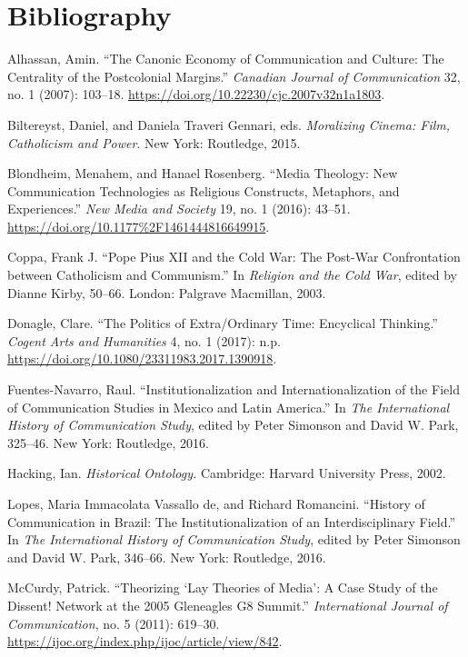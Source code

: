 \documentclass{tufte-handout}
\begin{document}
\section{Bibliography}\label{bibliography}

\begin{hangparas}{.25in}{1} 



Alhassan, Amin. ``The Canonic Economy of Communication and Culture: The
Centrality of the Postcolonial Margins.'' \emph{Canadian Journal of
Communication} 32, no. 1 (2007): 103­--18.
\url{https://doi.org/10.22230/cjc.2007v32n1a1803}.

Biltereyst, Daniel, and Daniela Traveri Gennari, eds. \emph{Moralizing Cinema: Film, Catholicism and Power}. New York: Routledge, 2015.

Blondheim, Menahem, and Hanael Rosenberg. ``Media Theology: New
Communication Technologies as Religious Constructs, Metaphors, and
Experiences.'' \emph{New Media and Society} 19, no. 1 (2016): 43--51.
\url{https://doi.org/10.1177\%2F1461444816649915}.

Coppa, Frank J. ``Pope Pius XII and the Cold War: The Post-War
Confrontation between Catholicism and Communism.'' In \emph{Religion and
the Cold War}, edited by Dianne Kirby, 50--66. London: Palgrave
Macmillan, 2003.

Donagle, Clare. ``The Politics of Extra/Ordinary Time: Encyclical
Thinking.'' \emph{Cogent Arts and Humanities} 4, no. 1 (2017): n.p.
\url{https://doi.org/10.1080/23311983.2017.1390918}.

Fuentes-Navarro, Raul. ``Institutionalization and Internationalization
of the Field of Communication Studies in Mexico and Latin America.'' In
\emph{The International History of Communication Study}, edited by Peter
Simonson and David W. Park, 325--46. New York: Routledge, 2016.

Hacking, Ian. \emph{Historical Ontology.} Cambridge: Harvard University
Press, 2002.

Lopes, Maria Immacolata Vassallo de, and Richard Romancini. ``History of
Communication in Brazil: The Institutionalization of an
Interdisciplinary Field.'' In \emph{The International History of
Communication Study}, edited by Peter Simonson and David W. Park,
346--66. New York: Routledge, 2016.

McCurdy, Patrick. ``Theorizing `Lay Theories of Media': A Case Study of
the Dissent! Network at the 2005 Gleneagles G8 Summit.''
\emph{International Journal of Communication}, no. 5 (2011): 619--30.
\url{https://ijoc.org/index.php/ijoc/article/view/842}.


\end{hangparas}
\end{document}
